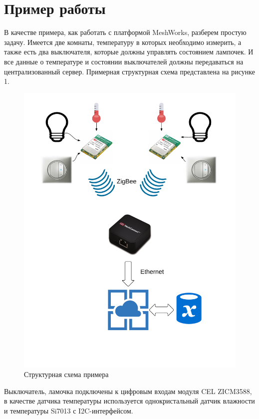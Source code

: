 \documentclass[11pt]{article}
\begin{document}
\section*{Пример работы}
В качестве примера, как работать с платформой MeshWorks, разберем простую задачу. 
Имеется две комнаты, температуру в которых необходимо измерить, а также есть два выключателя, 
которые должны управлять состоянием лампочек. И все данные о температуре и состоянии
выключателей должны передаваться на централизованный сервер. Примерная структурная
схема представлена на рисунке 1.
\begin{figure}[h!]
    \centering
    \includegraphics[scale=0.5]{cel-structure.png}
    \caption{Структурная схема примера}
\end{figure}

Выключатель, ламочка подключены к цифровым входам модуля CEL ZICM3588, в качестве
датчика температуры используется однокристальный датчик влажности и температуры
Si7013 с I2C-интерфейсом.
\end{document}
